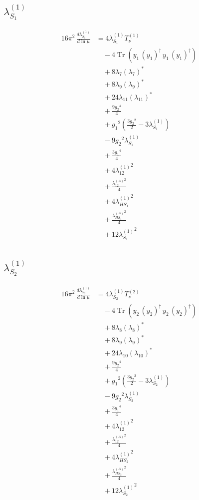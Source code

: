 \documentclass[10pt,a4paper]{article}
\begin{document}
\subsection*{$\lambda_{S_1}^{(1)}$}
\begin{align*}
16\pi^2\,\frac{d \lambda_{S_1}^{(1)}}{d\ln\mu} &=4 {\lambda_{S_1}^{(1)}} T_{\nu}^{(1)} \\
&\quad -4 \operatorname{Tr}\!\left({y_1}\,\left({y_1}\right)^{\dagger}\,{y_1}\,\left({y_1}\right)^{\dagger}\right) \\
&\quad +8 {\lambda_{7}} \left({\lambda_{7}}\right)^{*} \\
&\quad +8 {\lambda_{9}} \left({\lambda_{9}}\right)^{*} \\
&\quad +24 {\lambda_{11}} \left({\lambda_{11}}\right)^{*} \\
&\quad +\frac{9 {g_2}^4}{4} \\
&\quad +{g_1}^2 \left(\frac{3 {g_2}^2}{2}-3 {\lambda_{S_1}^{(1)}}\right) \\
&\quad -9 {g_2}^2 {\lambda_{S_1}^{(1)}} \\
&\quad +\frac{3 {g_1}^4}{4} \\
&\quad +4 {\lambda_{12}^{(1)}}^2 \\
&\quad +\frac{{\lambda_{12}^{(A)}}^2}{4} \\
&\quad +4 {\lambda_{HS_1}^{(1)}}^2 \\
&\quad +\frac{{\lambda_{HS_1}^{(A)}}^2}{4} \\
&\quad +12 {\lambda_{S_1}^{(1)}}^2 \\
\end{align*}
\subsection*{$\lambda_{S_2}^{(1)}$}
\begin{align*}
16\pi^2\,\frac{d \lambda_{S_2}^{(1)}}{d\ln\mu} &=4 {\lambda_{S_2}^{(1)}} T_{\nu}^{(2)} \\
&\quad -4 \operatorname{Tr}\!\left({y_2}\,\left({y_2}\right)^{\dagger}\,{y_2}\,\left({y_2}\right)^{\dagger}\right) \\
&\quad +8 {\lambda_{8}} \left({\lambda_{8}}\right)^{*} \\
&\quad +8 {\lambda_{9}} \left({\lambda_{9}}\right)^{*} \\
&\quad +24 {\lambda_{10}} \left({\lambda_{10}}\right)^{*} \\
&\quad +\frac{9 {g_2}^4}{4} \\
&\quad +{g_1}^2 \left(\frac{3 {g_2}^2}{2}-3 {\lambda_{S_2}^{(1)}}\right) \\
&\quad -9 {g_2}^2 {\lambda_{S_2}^{(1)}} \\
&\quad +\frac{3 {g_1}^4}{4} \\
&\quad +4 {\lambda_{12}^{(1)}}^2 \\
&\quad +\frac{{\lambda_{12}^{(A)}}^2}{4} \\
&\quad +4 {\lambda_{HS_2}^{(1)}}^2 \\
&\quad +\frac{{\lambda_{HS_2}^{(A)}}^2}{4} \\
&\quad +12 {\lambda_{S_2}^{(1)}}^2 \\
\end{align*}
\end{document}
